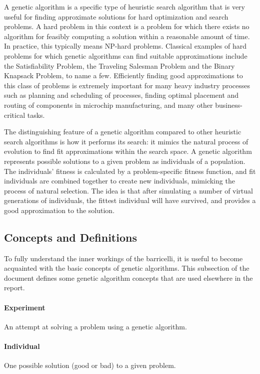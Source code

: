 A genetic algorithm is a specific type of heuristic search algorithm that is very useful for finding approximate solutions for hard optimization and search problems.
A hard problem in this context is a problem for which there exists no algorithm for feasibly computing a solution within a reasonable amount of time.
In practice, this typically means NP-hard problems.
Classical examples of hard problems for which genetic algorithms can find suitable approximations include the Satisfiability Problem, the Traveling Salesman Problem and the Binary Knapsack Problem, to name a few.
Efficiently finding good approximations to this class of problems is extremely important for many heavy industry processes such as planning and scheduling of processes, finding optimal placement and routing of components in microchip manufacturing, and many other business-critical tasks.


The distinguishing feature of a genetic algorithm compared to other heuristic search algorithms is how it performs its search: it mimics the natural process of evolution to find fit approximations within the search space.
A genetic algorithm represents possible solutions to a given problem as individuals of a population.
The individuals' fitness is calculated by a problem-specific fitness function, and fit individuals are combined together to create new individuals, mimicking the process of natural selection.
The idea is that after simulating a number of virtual generations of individuals, the fittest individual will have survived, and provides a good approximation to the solution.

\subsection{Concepts and Definitions}

To fully understand the inner workings of the \Gls{barricelli}, it is useful to become acquainted with the basic concepts of genetic algorithms.
This subsection of the document defines some genetic algorithm concepts that are used elsewhere in the report.

\paragraph{Experiment}
An attempt at solving a problem using a genetic algorithm.

\paragraph{Individual}
One possible solution (good or bad) to a given problem.

